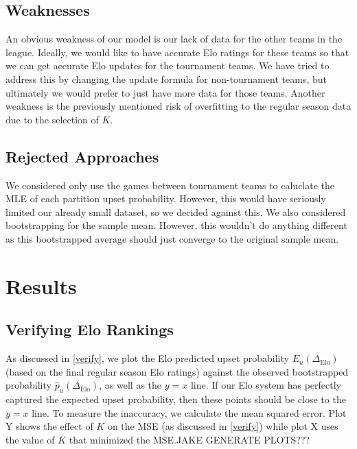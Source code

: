 \documentclass{article}
\begin{document}
\subsection{Weaknesses}
An obvious weakness of our model is our lack of data for the other teams in the league. Ideally, we would like to have accurate Elo ratings for these teams so that we can get accurate Elo updates for the tournament teams. We have tried to address this by changing the update formula for non-tournament teams, but ultimately we would prefer to just have more data for those teams. Another weakness is the previously mentioned risk of overfitting to the regular season data due to the selection of $K$. 

\subsection{Rejected Approaches}
We considered only use the games between tournament teams to caluclate the MLE of each partition upset probability. However, this would have seriously limited our already small dataset, so we decided against this. We also considered bootstrapping for the sample mean. However, this wouldn't do anything different as this bootstrapped average should just converge to the original sample mean. 

\section{Results}


\subsection{Verifying Elo Rankings}
As discussed in \autoref{verify}, we plot the Elo predicted upset probability $E_u(\Delta_{\text{Elo}})$ (based on the final regular season Elo ratings) against the observed bootstrapped probability $\hat{p}_u(\Delta_{\text{Elo}})$, as well as the $y=x$ line. If our Elo system has perfectly captured the expected upset probability, then these points should be close to the $y=x$ line. To measure the inaccuracy, we calculate the mean squared error. Plot Y shows the effect of $K$ on the MSE (as discussed in \autoref{verify}) while plot X uses the value of $K$ that minimized the MSE.\@ JAKE GENERATE PLOTS???
\end{document}
